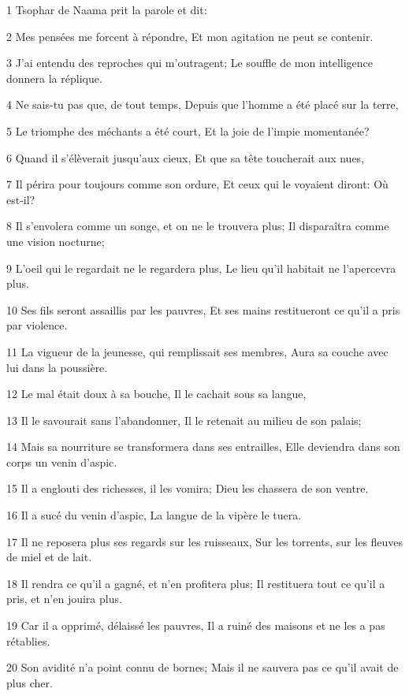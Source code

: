 \par 1 Tsophar de Naama prit la parole et dit:
\par 2 Mes pensées me forcent à répondre, Et mon agitation ne peut se contenir.
\par 3 J'ai entendu des reproches qui m'outragent; Le souffle de mon intelligence donnera la réplique.
\par 4 Ne sais-tu pas que, de tout temps, Depuis que l'homme a été placé sur la terre,
\par 5 Le triomphe des méchants a été court, Et la joie de l'impie momentanée?
\par 6 Quand il s'élèverait jusqu'aux cieux, Et que sa tête toucherait aux nues,
\par 7 Il périra pour toujours comme son ordure, Et ceux qui le voyaient diront: Où est-il?
\par 8 Il s'envolera comme un songe, et on ne le trouvera plus; Il disparaîtra comme une vision nocturne;
\par 9 L'oeil qui le regardait ne le regardera plus, Le lieu qu'il habitait ne l'apercevra plus.
\par 10 Ses fils seront assaillis par les pauvres, Et ses mains restitueront ce qu'il a pris par violence.
\par 11 La vigueur de la jeunesse, qui remplissait ses membres, Aura sa couche avec lui dans la poussière.
\par 12 Le mal était doux à sa bouche, Il le cachait sous sa langue,
\par 13 Il le savourait sans l'abandonner, Il le retenait au milieu de son palais;
\par 14 Mais sa nourriture se transformera dans ses entrailles, Elle deviendra dans son corps un venin d'aspic.
\par 15 Il a englouti des richesses, il les vomira; Dieu les chassera de son ventre.
\par 16 Il a sucé du venin d'aspic, La langue de la vipère le tuera.
\par 17 Il ne reposera plus ses regards sur les ruisseaux, Sur les torrents, sur les fleuves de miel et de lait.
\par 18 Il rendra ce qu'il a gagné, et n'en profitera plus; Il restituera tout ce qu'il a pris, et n'en jouira plus.
\par 19 Car il a opprimé, délaissé les pauvres, Il a ruiné des maisons et ne les a pas rétablies.
\par 20 Son avidité n'a point connu de bornes; Mais il ne sauvera pas ce qu'il avait de plus cher.
